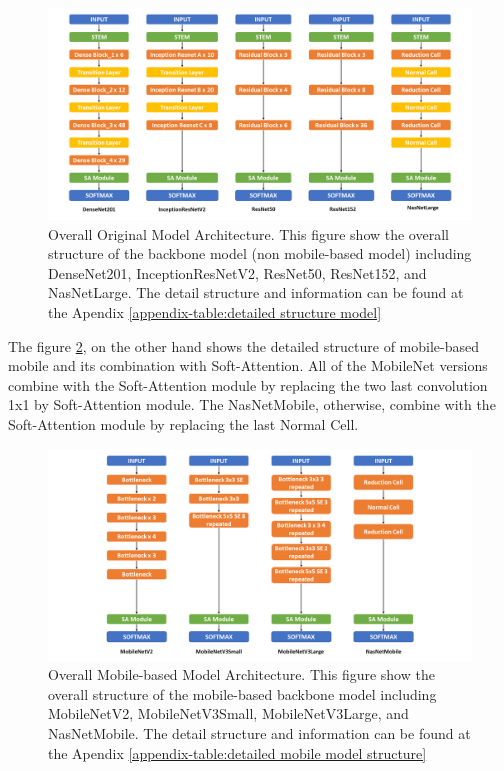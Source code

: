 \documentclass[sensors,article,submit,pdftex,moreauthors]{Definitions/mdpi}
\begin{document}
\begin{figure}[H]
	\centering
	\includegraphics[width=1\linewidth]{Definitions/Model Structure}
	\caption{Overall Original Model Architecture. This figure show the overall structure of the backbone model (non mobile-based model) including DenseNet201, InceptionResNetV2, ResNet50, ResNet152, and NasNetLarge. The detail structure and information can be found at the Apendix \ref{appendix-table:detailed structure model}}
	\label{fig:model-structure}
\end{figure}

The figure \ref{fig:mobile-model-structure}, on the other hand shows the detailed structure of mobile-based mobile and its combination with Soft-Attention. All of the MobileNet versions combine with the Soft-Attention module by replacing the two last convolution 1x1 by Soft-Attention module. The NasNetMobile, otherwise, combine with the Soft-Attention module by replacing the last Normal Cell. 
\begin{figure}[H]
	\centering
	\includegraphics[width=1\linewidth]{Definitions/Mobile Model Structure}
	\caption{Overall Mobile-based Model Architecture. This figure show the overall structure of the mobile-based backbone model including MobileNetV2, MobileNetV3Small, MobileNetV3Large, and NasNetMobile. The detail structure and information can be found at the Apendix \ref{appendix-table:detailed mobile model structure}}
	\label{fig:mobile-model-structure}
\end{figure}
\end{document}

